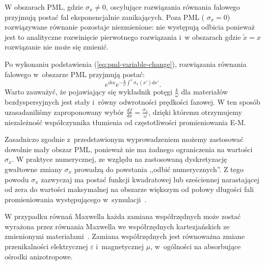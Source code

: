 W obszarach PML, gdzie $\sigma_x\ne0$, oscylujące rozwiązania równania falowego przyjmują postać fal eksponencjalnie zanikających. Poza PML ( $\sigma_x=0$) rozwiązywane równanie pozostaje niezmienione: nie występują odbicia ponieważ jest to analityczne rozwinięcie pierwotnego rozwiązania i~w obszarach gdzie $\tilde{x}=x$ rozwiązanie nie może się zmienić.

Po wykonaniu podstawienia (\ref{eq:pml-variable-change}), rozwiązania równania falowego w~obszarze PML przyjmują postać:
\begin{equation}
e^{ikx}e^{-\frac{k}{\omega}\int^x \sigma_x(x')dx'}.
\end{equation}
Warto zauważyć, że pojawiający się wykładnik potęgi $\frac{k}{\omega}$ dla materiałów bezdyspersyjnych jest stały i~równy odwrotności prędkości fazowej. W ten sposób uzasadaniliśmy zaproponowany wybór $\frac{df}{dx}=\frac{\sigma_x}{\omega}$, dzięki któremu otrzymujemy niezależność współczynnika tłumienia od częstotliwości promieniowania E-M. 

Zasadniczo zgodnie z~przedstawionym wyprowadzeniem możemy zastosować dowolnie mały obszar PML, ponieważ nie ma żadnego ograniczenia na wartości $\sigma_x$. W praktyce numerycznej, ze względu na zastosowaną dyskretyzację gwałtowne zmiany $\sigma_x$ prowadzą do powstania ,,odbić numerycznych''. Z tego powodu $\sigma_x$ zazwyczaj ma postać funkcji kwadratowej lub sześciennej narastającej od zera do wartości maksymalnej na obszarze większym od połowy długości fali promieniowania występującego w~symulacji~\cite{johnson2008notes}.

W przypadku równań Maxwella każda zamiana współrzędnych może zostać wyrażona przez równania Maxwella we współrzędnych kartezjańskich ze zmienionymi materiałami~\cite{ward1996refraction}. Zamiana współrzędnych jest równoważna zmiane przenikalności elektrycznej $\varepsilon$ i~magnetycznej $\mu$, w~ogólności na absorbujące ośrodki anizotropowe. 

